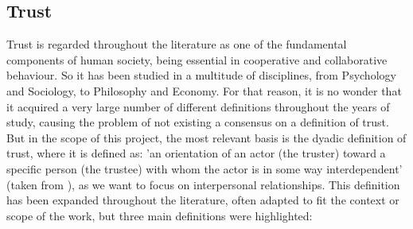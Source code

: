 \subsection{Trust}
\label{subsec:Trust}
Trust is regarded throughout the literature as one of the fundamental components of human society, being essential in cooperative and collaborative behaviour. So it has been studied in a multitude of disciplines, from Psychology and Sociology, to Philosophy and Economy\cite{Rousseau1998, Jones1997, Sabater2005}. For that reason, it is no wonder that it acquired a very large number of different definitions throughout the years of study, causing the problem of not existing a consensus on a definition of trust\cite{Castelfranchi2010}. But in the scope of this project, the most relevant basis is the dyadic definition of trust, where it is defined as: 'an orientation of an actor (the truster) toward a specific person (the trustee) with whom the actor is in some way interdependent' (taken from \cite{Simpson2007}), as we want to focus on interpersonal relationships. This definition has been expanded throughout the literature, often adapted to fit the context or scope of the work, but three main definitions were highlighted:
